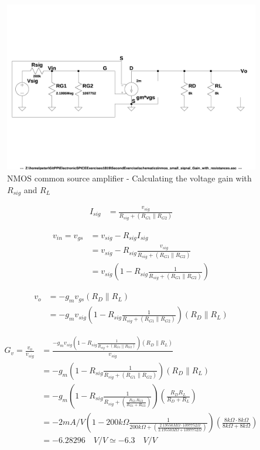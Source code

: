 \documentclass[10pt,a4paper]{book}
\begin{document}
\begin{figure}[h]
  \centering
  \includegraphics[width=12cm]{schematics/nmos_small_signal_with_resistances.jpg}
  \caption{NMOS common source amplifier - Calculating the voltage gain with $R_{sig}$ and $R_L$}
  \label{nmos_pi_gain_with_resistances}
\end{figure}

\begin{align}
I_{sig} &= \frac{v_{sig}}{R_{sig} + (R_{G1} \parallel R_{G2})}
\end{align}

\begin{align}
v_{in} = v_{gs} &= v_{sig} - R_{sig} I_{sig}\\
&= v_{sig} - R_{sig} \frac{v_{sig}}{R_{sig} + (R_{G1} \parallel R_{G2})}\\
&= v_{sig} \left(1 - R_{sig} \frac{1}{R_{sig} + (R_{G1} \parallel R_{G2})}\right)
\end{align}

\begin{align}
v_o &= -g_m v_{gs} (R_D \parallel R_L)\\
&= -g_m v_{sig} \left(1 - R_{sig} \frac{1}{R_{sig} + (R_{G1} \parallel R_{G2})}\right) (R_D \parallel R_L)
\end{align}


\begin{align}
G_v = \frac{v_o}{v_{sig}} &= \frac{-g_m v_{sig} \left(1 - R_{sig} \frac{1}{R_{sig} + (R_{G1} \parallel R_{G2})}\right) (R_D \parallel R_L)}{v_{sig}}\\
&= -g_m \left(1 - R_{sig} \frac{1}{R_{sig} + (R_{G1} \parallel R_{G2})}\right) (R_D \parallel R_L)\\
&= -g_m \left(1 - R_{sig} \frac{1}{R_{sig} + \left(\frac{R_{G1}R_{G2}}{R_{G1}+R_{G2}}\right)}\right) \left(\frac{R_{D}R_{L}}{R_{D}+R_{L}}\right)\\
&= - 2mA/V \left(1 - 200k\Omega \frac{1}{200k\Omega + \left(\frac{2.19550M\Omega \cdot 1097752\Omega}{2.19550M\Omega +1097752\Omega}\right)}\right) \left(\frac{8k\Omega \cdot 8k\Omega}{8k\Omega + 8k\Omega}\right)\\
&= -6.28296 \quad V/V \simeq -6.3 \quad V/V
\end{align}
\end{document}
